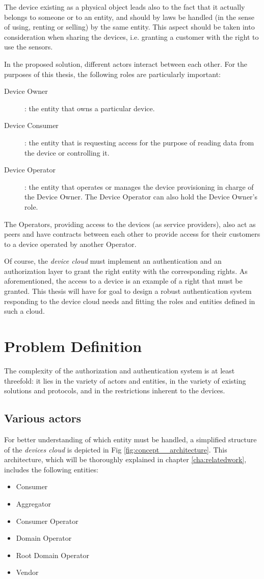 The device existing as a physical object leads also to the fact that it actually belongs to someone or to an entity, and should by laws be handled (in the sense of using, renting or selling) by the same entity. This aspect should be taken into consideration when sharing the devices, i.e. granting a customer with the right to use the sensors.

In the proposed solution, different actors interact between each other. For the purposes of this thesis, the following roles are particularly important:

\begin{description}
	\item[Device Owner]: the entity that owns a particular device.
	\item[Device Consumer]: the entity that is requesting access for the purpose of reading data from the device or controlling it.
	\item[Device Operator]: the entity that operates or manages the device provisioning in charge of the Device Owner. The Device Operator can also hold the Device Owner's role.
\end{description}

The Operators, providing access to the devices (as service providers), also act as peers and have contracts between each other to provide access for their customers to a device operated by another Operator.

Of course, the \emph{device cloud} must implement an authentication and an authorization layer to grant the right entity with the corresponding rights. As aforementioned, the access to a device is an example of a right that must be granted. This thesis will have for goal to design a robust authentication system responding to the device cloud needs and fitting the roles and entities defined in such a cloud. 


\section{Problem Definition}
The complexity of the authorization and authentication system is at least threefold: it lies in the variety of actors and entities, in the variety of existing solutions and protocols, and in the restrictions inherent to the devices.

\subsection{Various actors} 
For better understanding of which entity must be handled, a simplified structure of the \emph{devices cloud} is depicted in Fig \ref*{fig:concept__architecture}. This architecture, which will be thoroughly explained in chapter \ref{cha:relatedwork}, includes the following entities:
\begin{itemize}
	\item Consumer
	\item Aggregator
	\item Consumer Operator
	\item Domain Operator
	\item Root Domain Operator
	\item Vendor
\end{itemize}

